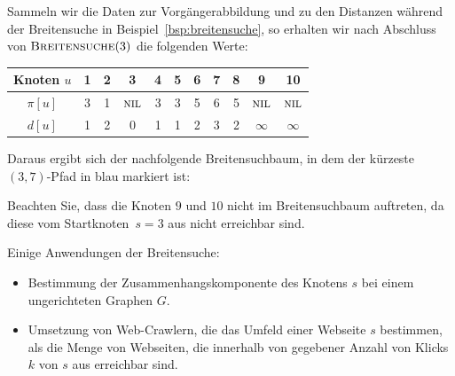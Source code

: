 \begin{bsp}
Sammeln wir die Daten zur Vorgängerabbildung und zu den Distanzen während der Breitensuche in Beispiel~\ref{bsp:breitensuche}, so erhalten wir nach Abschluss von $\mathop{\text{\textsc{Breitensuche}}}(3)$ die folgenden Werte:

\begin{table}[H]
\centering
\begin{tabular}{|c|c|c|c|c|c|c|c|c|c|c|}
\hline
\textbf{Knoten $u$}        & \textbf{1} & \textbf{2} & \textbf{3} & \textbf{4} & \textbf{5} & \textbf{6} & \textbf{7} & \textbf{8} & \textbf{9} & \textbf{10} \\ \hline
\textbf{$\pi[u]$}    & 3          & 1          & $\mathop{\text{\textsc{nil}}}$          & 3          & 3          & 5          & 6         & 5         & $\mathop{\text{\textsc{nil}}}$         & $\mathop{\text{\textsc{nil}}}$          \\ \hline
\textbf{$d[u]$} & 1          & 2          & 0         & 1          & 1         & 2         & 3         & 2         & $\infty$         & $\infty$          \\ \hline
\end{tabular}
\end{table}

Daraus ergibt sich der nachfolgende Breitensuchbaum, in dem der kürzeste $(3,7)$-Pfad in blau markiert ist:

\begin{center} 
\end{center} 

Beachten Sie, dass die Knoten $9$ und $10$ nicht im Breitensuchbaum auftreten, da diese vom Startknoten~$s=3$ aus nicht erreichbar sind.
\end{bsp}

\begin{bem} Einige Anwendungen der Breitensuche: 
	\begin{itemize} 
		\item Bestimmung der Zusammenhangskomponente des Knotens $s$ bei einem ungerichteten Graphen $G$. 
		\item Umsetzung von Web-Crawlern, die das Umfeld einer Webseite $s$ bestimmen, als die Menge von Webseiten, die innerhalb von gegebener Anzahl von Klicks $k$ von $s$ aus erreichbar sind. 
	\end{itemize}
\end{bem} 

